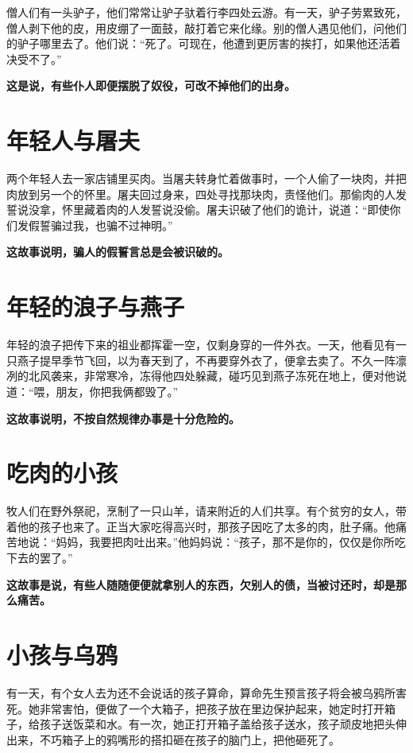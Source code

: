僧人们有一头驴子，他们常常让驴子驮着行李四处云游。有一天，驴子劳累致死，僧人剥下他的皮，用皮绷了一面鼓，敲打着它来化缘。别的僧人遇见他们，问他们的驴子哪里去了。他们说：“死了。可现在，他遭到更厉害的挨打，如果他还活着决受不了。”

{\bfseries \color{red}这是说，有些仆人即便摆脱了奴役，可改不掉他们的出身。}

\section{年轻人与屠夫}

两个年轻人去一家店铺里买肉。当屠夫转身忙着做事时，一个人偷了一块肉，并把肉放到另一个的怀里。屠夫回过身来，四处寻找那块肉，责怪他们。那偷肉的人发誓说没拿，怀里藏着肉的人发誓说没偷。屠夫识破了他们的诡计，说道：“即使你们发假誓骗过我，也骗不过神明。”

{\bfseries \color{red}这故事说明，骗人的假誓言总是会被识破的。}

\section{年轻的浪子与燕子}

年轻的浪子把传下来的祖业都挥霍一空，仅剩身穿的一件外衣。一天，他看见有一只燕子提早季节飞回，以为春天到了，不再要穿外衣了，便拿去卖了。不久一阵凛冽的北风袭来，非常寒冷，冻得他四处躲藏，碰巧见到燕子冻死在地上，便对他说道：“喂，朋友，你把我俩都毁了。”

{\bfseries \color{red}这故事说明，不按自然规律办事是十分危险的。}

\section{吃肉的小孩}

牧人们在野外祭祀，烹制了一只山羊，请来附近的人们共享。有个贫穷的女人，带着他的孩子也来了。正当大家吃得高兴时，那孩子因吃了太多的肉，肚子痛。他痛苦地说：“妈妈，我要把肉吐出来。”他妈妈说：“孩子，那不是你的，仅仅是你所吃下去的罢了。”

{\bfseries \color{red}这故事是说，有些人随随便便就拿别人的东西，欠别人的债，当被讨还时，却是那么痛苦。}

\section{小孩与乌鸦}

有一天，有个女人去为还不会说话的孩子算命，算命先生预言孩子将会被乌鸦所害死。她非常害怕，便做了一个大箱子，把孩子放在里边保护起来，她定时打开箱子，给孩子送饭菜和水。有一次，她正打开箱子盖给孩子送水，孩子顽皮地把头伸出来，不巧箱子上的鸦嘴形的搭扣砸在孩子的脑门上，把他砸死了。

